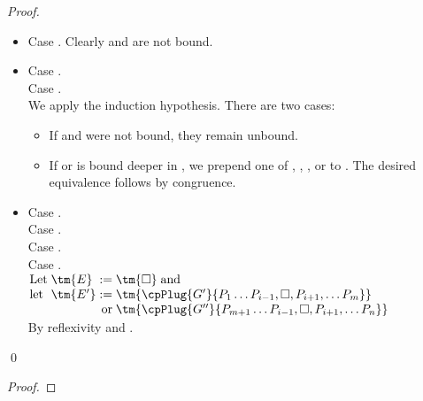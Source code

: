 \documentclass[UKenglish]{llncs}
\begin{document}
\begin{subappendices}
\begin{proof}
\begin{itemize}
    \item
      Case \tm{\Box}. Clearly  and  are not bound.
    \item
      Case .\\
      Case .\\
      We apply the induction hypothesis. There are two cases:
      \begin{itemize}
      \item
        If  and  were not bound, they remain unbound.
      \item
        If  or  is bound deeper in , we prepend one of
        ,
        ,
        , or
         to .
        The desired equivalence follows by congruence.
      \end{itemize}
    \item
      Case .\\
      Case .\\
      Case .\\
      Case .
      \\
      \(\arraycolsep=0pt\begin{array}[t]{llrl}
        \text{Let} & \; \tm{E}  &\; :=     &\; \tm{\Box} \; \text{and} \\
        \text{let} & \; \tm{E'} &\; :=     &\; \tm{\cpPlug{G'}{P_1 \dots P_{i-1}, \Box, P_{i+1}, \dots P_m}} \\
                   &            &\text{or} &\; \tm{\cpPlug{G''}{P_{m+1} \dots P_{i-1}, \Box, P_{i+1}, \dots P_n}}
      \end{array}\)
      \\[1ex]
      By reflexivity and \cpEquivCutComm.
    \end{itemize}
    \qed
  \end{proof}
  \thmcpprogressbeta
  \begin{proof}

\end{proof}
\end{subappendices}
\end{document}
